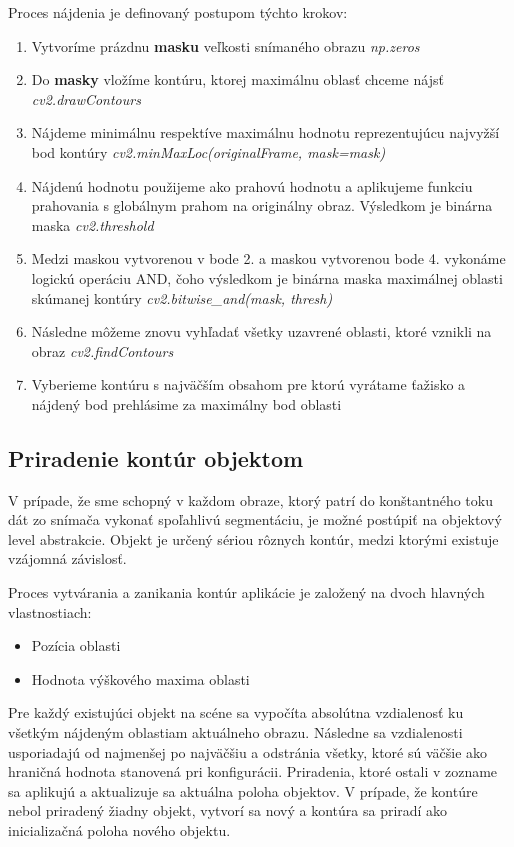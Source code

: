 Proces nájdenia je definovaný postupom týchto krokov: 
\begin{enumerate}
  \item Vytvoríme prázdnu \textbf{masku} veľkosti snímaného obrazu \textit{np.zeros}
  \item Do \textbf{masky} vložíme kontúru, ktorej maximálnu oblasť chceme nájsť \textit{cv2.drawContours}
  \item Nájdeme minimálnu respektíve maximálnu hodnotu reprezentujúcu najvyžší bod kontúry  \textit{cv2.minMaxLoc(originalFrame, mask=mask)}
  \item Nájdenú hodnotu použijeme ako prahovú hodnotu a aplikujeme funkciu prahovania s globálnym prahom na originálny obraz. Výsledkom je binárna maska \textit{cv2.threshold}
  \item Medzi maskou vytvorenou v bode 2. a maskou vytvorenou bode 4. vykonáme logickú operáciu AND, čoho výsledkom je binárna maska maximálnej oblasti skúmanej kontúry \textit{cv2.bitwise\_and(mask, thresh)}
  \item Následne môžeme znovu vyhľadať všetky uzavrené oblasti, ktoré vznikli na obraz \textit{cv2.findContours}
  \item Vyberieme kontúru s najväčším obsahom pre ktorú vyrátame ťažisko a nájdený bod prehlásime za maximálny bod oblasti
\end{enumerate}

\subsection{Priradenie kontúr objektom}
V prípade, že sme schopný v každom obraze, ktorý patrí do konštantného toku dát zo snímača vykonať spoľahlivú segmentáciu, je možné postúpiť na objektový level abstrakcie. Objekt je určený sériou rôznych kontúr, medzi ktorými existuje vzájomná závislosť.  

Proces vytvárania a zanikania kontúr aplikácie je založený na dvoch hlavných vlastnostiach:
\begin{itemize}
\item Pozícia oblasti
\item Hodnota výškového maxima oblasti
\end{itemize}

Pre každý existujúci objekt na scéne sa vypočíta absolútna vzdialenosť ku všetkým nájdeným oblastiam aktuálneho obrazu. Následne sa vzdialenosti usporiadajú od najmenšej po najväčšiu a odstránia všetky, ktoré sú väčšie ako hraničná hodnota stanovená pri konfigurácii. Priradenia, ktoré ostali v zozname sa aplikujú a aktualizuje sa aktuálna poloha objektov. V prípade, že kontúre nebol priradený žiadny objekt, vytvorí sa nový a kontúra sa priradí ako inicializačná poloha nového objektu. 

